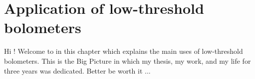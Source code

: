 
\chapter{Application of low-threshold bolometers} %

\label{ChapterIntro} %


Hi !
Welcome to in this chapter which explains the main uses of low-threshold bolometers.
This is the Big Picture in which my thesis, my work, and my life for three years was dedicated.
Better be worth it ...